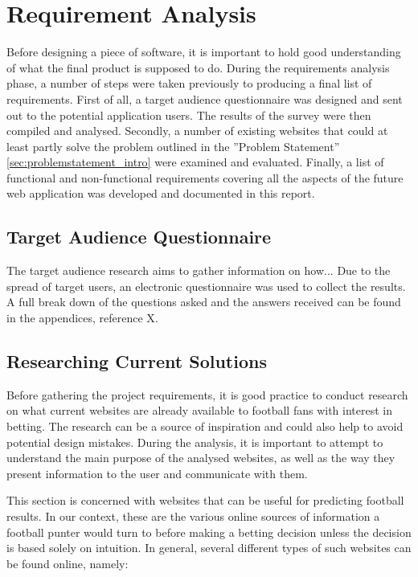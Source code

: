 \chapter{Requirement Analysis}
\label{ch:requirementanalysis}
Before designing a piece of software, it is important to hold good understanding of what the final product is supposed to do. During the requirements analysis phase, a number of steps were taken previously to producing a final list of requirements. First of all, a target audience questionnaire was designed and sent out to the potential application users. The results of the survey were then compiled and analysed. Secondly, a number of existing websites that could at least partly solve the problem outlined in the ”Problem Statement” \ref{sec:problemstatement_intro}  were examined and evaluated. Finally, a list of functional and non-functional requirements covering all the aspects of the future web application was developed and documented in this report.

\section{Target Audience Questionnaire}
\label{sec:targetaudiencequestionnaire_req}
The target audience research aims to gather information on how...
Due to the spread of target users, an electronic questionnaire was used to collect the results. A full break down of the questions asked and the answers received can be found in the appendices, reference X.

\section{Researching Current Solutions}
\label{sec:currentsolutions_req}
Before gathering the project requirements, it is good practice to conduct research on what current websites are already available to football fans with interest in betting. The research can be a source of inspiration and could also help to avoid potential design mistakes. During the analysis, it is important to attempt to understand the main purpose of the analysed websites, as well as the way they present information to the user and communicate with them. 

This section is concerned with websites that can be useful for predicting football results. In our context, these are the various online sources of information a football punter would turn to before making a betting decision unless the decision is based solely on intuition. In general, several different types of such websites can be found online, namely:
		
